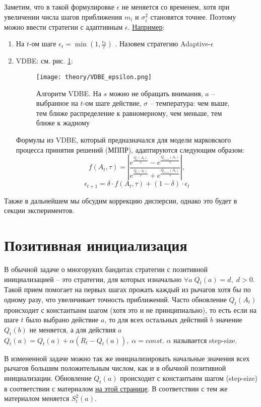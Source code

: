 Заметим, что в такой формулировке $\epsilon$ не меняется со временем, хотя при увеличении числа шагов приближения $m_i$ и $\sigma_i^2$ становятся точнее. Поэтому можно ввести стратегии с адаптивным $\epsilon$. \href{https://en.wikipedia.org/wiki/Multi-armed_bandit}{Например}:
\begin{enumerate}
    \item На $t$-ом шаге $\epsilon_t = \min(1, \frac{\epsilon_0}{t})$ \cite{srank}. Назовем стратегию Adaptive-$\epsilon$
    \item VDBE: см. рис. \ref{fig:VDBE_epsilon}:
    \begin{figure}
        \texttt{[image: theory/VDBE\_epsilon.png]}
        \caption{\label{fig:VDBE_epsilon} Алгоритм VDBE. На $s$ можно не обращать внимания, $a$ -- выбранное на $t$-ом шаге действие, $\sigma$ -- температура: чем выше, тем ближе распределение к равномерному, чем меньше, тем ближе к жадному \cite{tolic_VDBE}}
    \end{figure}
    Формулы из VDBE, который предназначался для модели марковского процесса принятия решений (МППР), адаптируются следующим образом:
    \[
    f(A_t, \tau) = \left| \frac{e^{\frac{Q_t(A_t)}{\tau}} - e^{\frac{Q_{t + 1}(A_t)}{\tau}}}{e^{\frac{Q_t(A_t)}{\tau}} + e^{\frac{Q_{t + 1}(A_t)}{\tau}}} \right|,
    \]
    \[
    \epsilon_{t+1} = \delta \cdot f(A_t, \tau) + (1 - \delta) \cdot \epsilon_t
    \]
\end{enumerate}
Также в дальнейшем мы обсудим коррекцию дисперсии, однако это будет в секции экспериментов.

\section{Позитивная инициализация}

В обычной задаче о многоруких бандитах стратегии с позитивной инициализацией -- это стратегии, для которых изначально $\forall a \; Q_t(a) = d, \; d > 0$. Такой прием помогает на первых шагах прожать каждый из рычагов хотя бы по одному разу, что увеличивает точность приближений. Часто обновление $Q_t(A_t)$ происходит с константынм шагом (хотя это и не принципиально), то есть если на шаге $t$ было выбрано действие $a$, то для всех остальных действий $b$ значение $Q_t(b)$ не меняется, а для действия $a$ $Q_t(a) = Q_t(a) + \alpha (R_t - Q_t(a)), \; \alpha = const$. $\alpha$ называется step-size.

В измененной задаче можно так же инициализировать начальные значения всех рычагов большим положительным числом, как и в обычной позитивной инициализации. Обновление $Q_t(a)$ происходит с константынм шагом (step-size) в соответствии с материалом \href{https://matteosantama.github.io/ewm/}{на этой странице}. В соответствии с тем же материалом меняется $S_t^2(a)$.


